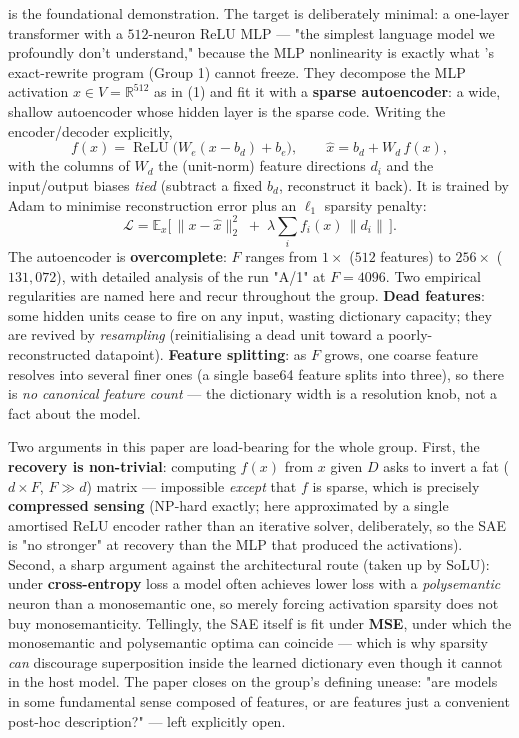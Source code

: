 \textcite{towards-monosemanticity} is the foundational demonstration. The target is deliberately minimal: a one-layer transformer with a $512$-neuron ReLU MLP --- "the simplest language model we profoundly don't understand," because the MLP nonlinearity is exactly what \textcite{framework}'s exact-rewrite program (Group 1) cannot freeze. They decompose the MLP activation $x\in V=\mathbb{R}^{512}$ as in (1) and fit it with a \textbf{sparse autoencoder}: a wide, shallow autoencoder whose hidden layer is the sparse code. Writing the encoder/decoder explicitly,
\[
f(x)=\operatorname{ReLU}\!\big(W_{e}(x-b_{d})+b_{e}\big),\qquad
\hat x = b_{d}+W_{d}\,f(x),
\]
with the columns of $W_{d}$ the (unit-norm) feature directions $d_i$ and the input/output biases \emph{tied} (subtract a fixed $b_d$, reconstruct it back). It is trained by Adam to minimise reconstruction error plus an $\ell_1$ sparsity penalty:
\[
\mathcal{L}=\mathbb{E}_{x}\Big[\,\lVert x-\hat x\rVert_{2}^{2}\;+\;\lambda\sum_i f_i(x)\,\big\rVert d_i\big\rVert\,\Big].
\]
The autoencoder is \textbf{overcomplete}: $F$ ranges from $1\times$ ($512$ features) to $256\times$ ($131{,}072$), with detailed analysis of the run "A/1" at $F=4096$. Two empirical regularities are named here and recur throughout the group. \textbf{Dead features}: some hidden units cease to fire on any input, wasting dictionary capacity; they are revived by \emph{resampling} (reinitialising a dead unit toward a poorly-reconstructed datapoint). \textbf{Feature splitting}: as $F$ grows, one coarse feature resolves into several finer ones (a single base64 feature splits into three), so there is \emph{no canonical feature count} --- the dictionary width is a resolution knob, not a fact about the model.

Two arguments in this paper are load-bearing for the whole group. First, the \textbf{recovery is non-trivial}: computing $f(x)$ from $x$ given $D$ asks to invert a fat ($d\times F$, $F\gg d$) matrix --- impossible \emph{except} that $f$ is sparse, which is precisely \textbf{compressed sensing} (NP-hard exactly; here approximated by a single amortised ReLU encoder rather than an iterative solver, deliberately, so the SAE is "no stronger" at recovery than the MLP that produced the activations). Second, a sharp argument against the architectural route (taken up by SoLU): under \textbf{cross-entropy} loss a model often achieves lower loss with a \emph{polysemantic} neuron than a monosemantic one, so merely forcing activation sparsity does not buy monosemanticity. Tellingly, the SAE itself is fit under \textbf{MSE}, under which the monosemantic and polysemantic optima can coincide --- which is why sparsity \emph{can} discourage superposition inside the learned dictionary even though it cannot in the host model. The paper closes on the group's defining unease: "are models in some fundamental sense composed of features, or are features just a convenient post-hoc description?" --- left explicitly open.

